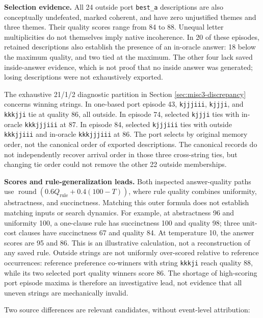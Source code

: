 \documentclass[10pt,letterpaper]{article}
\begin{document}


\textbf{Selection evidence.} All 24 outside port \texttt{best\_a} descriptions are also
conceptually undefeated, marked coherent, and have zero unjustified themes and three
themes. Their quality scores range from 84 to 88. Unequal letter multiplicities do not
themselves imply native incoherence. In 20 of these episodes, retained descriptions also
establish the presence of an in-oracle answer: 18 below the maximum quality, and two tied
at the maximum. The other four lack saved inside-answer evidence, which is not proof that
no inside answer was generated; losing descriptions were not exhaustively exported.

The exhaustive 21/1/2 diagnostic partition in Section \ref{sec:misc3-discrepancy} concerns
winning strings. In one-based port episode 43, \texttt{kjjjiii}, \texttt{kjjji}, and
\texttt{kkkjji} tie at quality 86, all outside. In episode 74, selected \texttt{kjjji}
ties with in-oracle \texttt{kkkjjjiii} at 87. In episode 84, selected \texttt{kjjjiii}
ties with outside \texttt{kkkjjiii} and in-oracle \texttt{kkkjjjiii} at 86. The port
selects by original memory order, not the canonical order of exported descriptions. The
canonical records do not independently recover arrival order in those three cross-string
ties, but changing tie order could not remove the other 22 outside memberships.

\textbf{Scores and rule-generalization leads.} Both inspected answer-quality paths use
\(\operatorname{round}(0.6 Q_{\mathrm{rule}}+0.4(100-T))\), where rule quality combines
uniformity, abstractness, and succinctness. Matching this outer formula does not establish
matching inputs or search dynamics. For example, at abstractness 96 and uniformity 100, a
one-clause rule has succinctness 100 and quality 98; three unit-cost clauses have
succinctness 67 and quality 84. At temperature 10, the answer scores are 95 and 86. This
is an illustrative calculation, not a reconstruction of any saved rule. Outside strings
are not uniformly over-scored relative to reference occurrences: reference preference
co-winners with string \texttt{kkkji} reach quality 88, while its two selected port
quality winners score 86. The shortage of high-scoring port episode maxima is therefore an
investigative lead, not evidence that all uneven strings are mechanically invalid.

Two source differences are relevant candidates, without event-level attribution:
\end{document}
